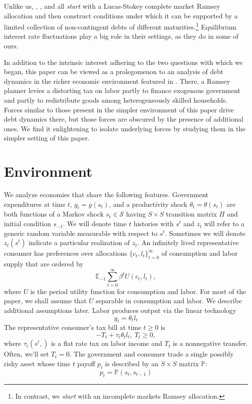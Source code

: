 \documentclass[12pt]{article}
\begin{document}
 Unlike us, \citet{Angeletos}, \citet{Buera_Nicolini}, and \citet{Shin2007} all  {\em start} with a Lucas-Stokey complete market  
Ramsey allocation
and then construct conditions under which it  can be supported by  a limited  collection of non-contingent debts of different maturities.\footnote{In contrast,
we {\em start} with an incomplete markets Ramsey allocation.}
Equilibrium interest rate fluctuations
play a big role in their settings, as they do in some of ours.  

In addition to the intrinsic interest adhering to the two questions with which we began, this paper can be viewed as
a prolegomenon to an analysis of debt dynamics in the richer   economic environment featured in \citet{BEGS1}.  There,
a Ramsey planner levies a distorting tax on labor partly to finance exogenous government  and partly to redistribute goods among heterogeneously skilled households.
Forces similar to those present in the simpler environment of this paper drive debt dynamics there,  but those forces are obscured by the presence of
additional ones.  We find it enlightening to isolate underlying forces by studying them in the  simpler setting of this paper.

\section{Environment}



We analyze economies that share the following features.
Government expenditures at time $t$, $g_t=g(s_t)$, and a productivity shock $\theta_t=\theta(s_t)$ are both functions of
  a Markov  shock $s_t\in \mathcal{S}$ having  $S \times S$ transition matrix $\Pi$ and initial condition $s_{-1}$. We will denote time $t$ histories with $s^t$ and $z_t$ will refer to a generic random variable measurable with respect to $s^t$. Sometimes we will denote $z_t(s^t)$ indicate a particular realization of $z_t$.
 An infinitely lived representative consumer has preferences over allocations  $\{c_t, l_t\}_{t=0}^\infty$ of consumption and labor supply that are ordered
by
   \begin{equation}
   \label{eqn:obj}
\mathbb{E}_{-1}\sum_{t=0}^{\infty } \beta^t  U\left(
c_t,l_t\right),
\end{equation}%
where $U$ is the period utility function for consumption and labor.  For most of the paper,  we shall assume that $U$ separable in consumption and labor.  We describe additional assumptions later.  Labor produces output via the linear technology
  \begin{equation*}
  y_t=\theta_{t} l_{t} \end{equation*}
The representative consumer's tax bill
 at time $t \geq 0$ is
 \[- T_t + \tau_t \theta_{t}l_{t},  \ T_t \geq 0, \]
 where $\tau_t(s^t,)$ is a flat rate tax on labor income and $T_t$ is a nonnegative transfer.
 Often, we'll set $T_t =0$.
The government and consumer trade a single  possibly risky  asset whose  time $t$ payoff $p_t$ is described by an $S \times S$ matrix $\mathbb{P}$:
\[p_t=\mathbb{P}(s_{t},s_{t-1}) \]
\end{document}

